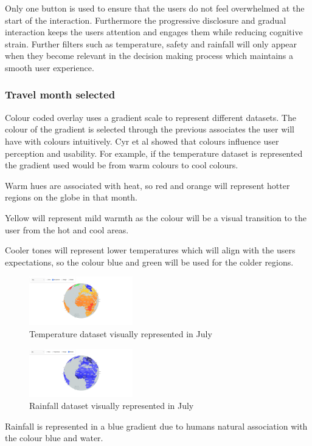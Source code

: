 \documentclass[]{project_final}
\begin{document}
Only one button is used to ensure that the users do not feel overwhelmed at the start of the interaction. Furthermore the progressive disclosure and gradual interaction keeps the users attention and engages them while reducing cognitive strain. Further filters such as temperature, safety and rainfall will only appear when they become relevant in the decision making process which maintains a smooth user experience.

\subsubsection{Travel month selected}

Colour coded overlay uses a gradient scale to represent different datasets. The colour of the gradient is selected through the previous associates the user will have with colours intuitively. Cyr et al showed that colours influence user perception and usability. For example, if the temperature dataset is represented the gradient used would be from warm colours to cool colours.

Warm hues are associated with heat, so red and orange will represent hotter regions on the globe in that month.

Yellow will represent mild warmth as the colour will be a visual transition to the user from the hot and cool areas.

Cooler tones will represent lower temperatures which will align with the users expectations, so the colour blue and green will be used for the colder regions.

\begin{figure}[ht!]
  \centering
  \includegraphics[width=0.4\textwidth]{4.png}
  \caption{Temperature dataset visually represented in July}
  \label{fig:1}
\end{figure}

\begin{figure}[ht!]
  \centering
  \includegraphics[width=0.4\textwidth]{5.png}
  \caption{Rainfall dataset visually represented in July}
  \label{fig:1}
\end{figure}
Rainfall is represented in a blue gradient due to humans natural association with the colour blue and water.
\end{document}
